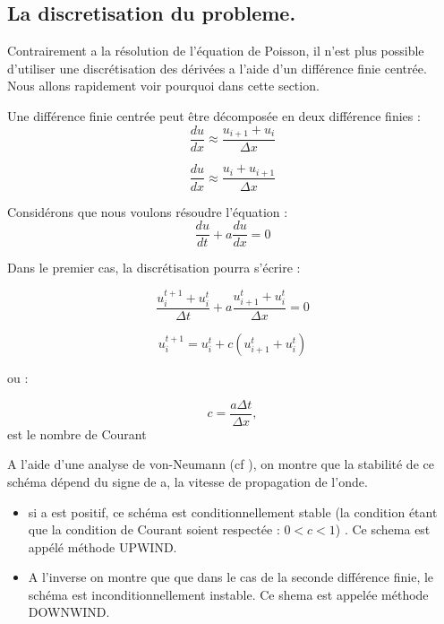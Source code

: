 \subsection{La discretisation du probleme.}


Contrairement a la résolution de l’équation de Poisson, il n'est plus possible d'utiliser une discrétisation des dérivées a l'aide d'un différence finie centrée.
Nous allons rapidement voir pourquoi dans cette section.


Une différence finie centrée peut être décomposée en deux différence finies : 
\begin{equation}
\frac{d u}{dx} \approx \frac{u_{i+1}  + u_i}{\Delta x} 
\end{equation}

\begin{equation}
\frac{d u}{dx} \approx \frac{u_i  + u_{i+1}}{\Delta x} 
\end{equation}



Considérons que nous voulons résoudre l'équation :
\begin{equation}
\frac{du}{dt} + a\frac{du}{dx} = 0
\end{equation}

Dans le premier cas, la discrétisation pourra s'écrire : 


\begin{equation}
\frac{u_i^{t+1} + u_i^t }{\Delta t}   +a \frac{u_{i+1}^t  + u_i^t}{\Delta x} = 0
\end{equation}


\begin{equation}
u_i^{t+1}  = u_i^t +  c \left( u_{i+1}^t  + u_i^t \right) 
\end{equation}

ou : 

\begin{equation}
c= \frac{a \Delta t}{\Delta x},
\end{equation}
est le nombre de Courant


A l'aide d'une analyse de von-Neumann (cf \cite{toro1999riemann}), on montre que la stabilité de ce schéma dépend du signe de a, la vitesse de propagation de l'onde.

\begin{itemize}
\item si a est positif, ce schéma est conditionnellement stable (la condition étant que la condition de Courant soient respectée : $0<c<1$) .
Ce schema est appélé méthode UPWIND.

\item A l'inverse on montre que que dans le cas de la seconde différence finie, le schéma est inconditionnellement instable. 
Ce shema est appelée méthode DOWNWIND.
\end{itemize}

